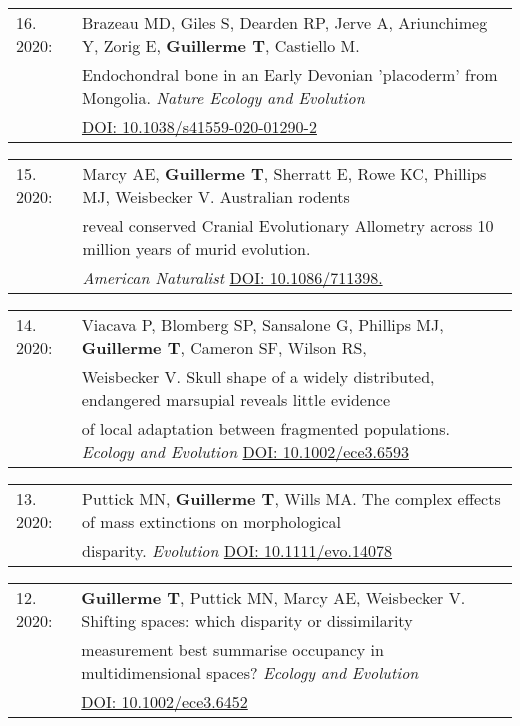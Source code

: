 \documentclass[10pt,a4paper]{article}
\begin{document}
{\begin{tabular}{ll}
16. 2020: & Brazeau MD, Giles S, Dearden RP, Jerve A, Ariunchimeg Y, Zorig E, \textbf{Guillerme T}, Castiello M.\\
      & Endochondral bone in an Early Devonian 'placoderm' from Mongolia. \textit{Nature Ecology and Evolution}\\
      & \href{https://www.nature.com/articles/s41559-020-01290-2}{DOI: 10.1038/s41559-020-01290-2}\\
\end{tabular}
\bigskip


\begin{tabular}{ll}
15. 2020: & Marcy AE, \textbf{Guillerme T}, Sherratt E, Rowe KC, Phillips MJ, Weisbecker V. Australian rodents\\
      & reveal conserved Cranial Evolutionary Allometry across 10 million years of murid evolution.\\
      & \textit{American Naturalist} \href{https://www.journals.uchicago.edu/doi/abs/10.1086/711398?journalCode=an}{DOI: 10.1086/711398.}\\
\end{tabular}
\bigskip




\begin{tabular}{ll}
14. 2020: & Viacava P, Blomberg SP, Sansalone G, Phillips MJ, \textbf{Guillerme T}, Cameron SF, Wilson RS,\\
      & Weisbecker V. Skull shape of a widely distributed, endangered marsupial reveals little evidence\\
      & of local adaptation between fragmented populations. \textit{Ecology and Evolution} \href{https://onlinelibrary.wiley.com/doi/full/10.1002/ece3.6593}{DOI: 10.1002/ece3.6593}\\
\end{tabular}
\bigskip



\begin{tabular}{ll}
13. 2020: & Puttick MN, \textbf{Guillerme T}, Wills MA. The complex effects of mass extinctions on morphological\\
          & disparity. \textit{Evolution} \href{https://onlinelibrary.wiley.com/doi/abs/10.1111/evo.14078}{DOI: 10.1111/evo.14078}\\
\end{tabular}
\bigskip




\begin{tabular}{ll}
12. 2020: & \textbf{Guillerme T}, Puttick MN, Marcy AE, Weisbecker V. Shifting spaces: which disparity or dissimilarity\\
      & measurement best summarise occupancy in multidimensional spaces? \textit{Ecology and Evolution}\\
      & \href{https://onlinelibrary.wiley.com/doi/full/10.1002/ece3.6452}{DOI: 10.1002/ece3.6452}\\
\end{tabular}
\bigskip

}
\end{document}

